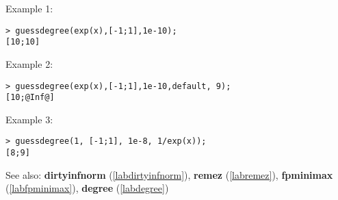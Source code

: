 \noindent Example 1: 
\begin{center}\begin{minipage}{15cm}\begin{Verbatim}[frame=single]
> guessdegree(exp(x),[-1;1],1e-10);
[10;10]
\end{Verbatim}
\end{minipage}\end{center}
\noindent Example 2: 
\begin{center}\begin{minipage}{15cm}\begin{Verbatim}[frame=single]
> guessdegree(exp(x),[-1;1],1e-10,default, 9);
[10;@Inf@]
\end{Verbatim}
\end{minipage}\end{center}
\noindent Example 3: 
\begin{center}\begin{minipage}{15cm}\begin{Verbatim}[frame=single]
> guessdegree(1, [-1;1], 1e-8, 1/exp(x));
[8;9]
\end{Verbatim}
\end{minipage}\end{center}
See also: \textbf{dirtyinfnorm} (\ref{labdirtyinfnorm}), \textbf{remez} (\ref{labremez}), \textbf{fpminimax} (\ref{labfpminimax}), \textbf{degree} (\ref{labdegree})
